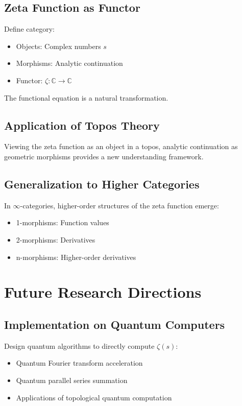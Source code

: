 \documentclass[11pt]{article}
\begin{document}
\subsection{Zeta Function as Functor}

Define category:
\begin{itemize}
\item Objects: Complex numbers $s$
\item Morphisms: Analytic continuation
\item Functor: $\zeta: \mathbb{C} \to \mathbb{C}$
\end{itemize}

The functional equation is a natural transformation.

\subsection{Application of Topos Theory}

Viewing the zeta function as an object in a topos, analytic continuation as geometric morphisms provides a new understanding framework.

\subsection{Generalization to Higher Categories}

In $\infty$-categories, higher-order structures of the zeta function emerge:
\begin{itemize}
\item 1-morphisms: Function values
\item 2-morphisms: Derivatives
\item n-morphisms: Higher-order derivatives
\end{itemize}

\section{Future Research Directions}

\subsection{Implementation on Quantum Computers}

Design quantum algorithms to directly compute $\zeta(s)$:
\begin{itemize}
\item Quantum Fourier transform acceleration
\item Quantum parallel series summation
\item Applications of topological quantum computation
\end{itemize}
\end{document}
